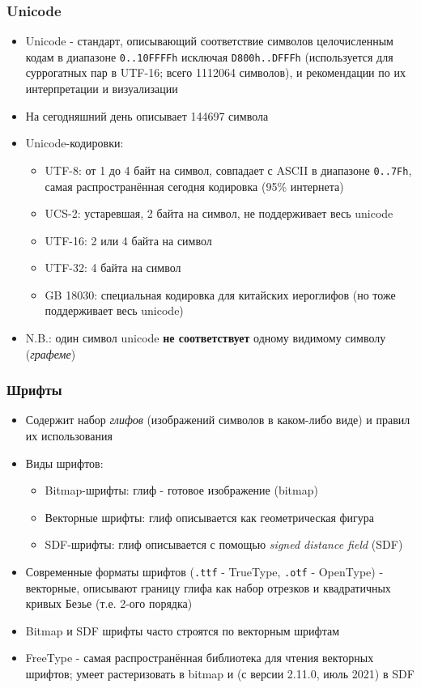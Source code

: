 \documentclass{beamer}
\begin{document}
\begin{frame}[fragile]
\frametitle{Unicode}
\begin{itemize}
\item Unicode - стандарт, описывающий соответствие символов целочисленным кодам в диапазоне \verb|0..10FFFFh| исключая \verb|D800h..DFFFh| (используется для суррогатных пар в UTF-16; всего 1112064 символов), и рекомендации по их интерпретации и визуализации
\pause
\item На сегодняшний день описывает 144697 символа
\pause
\item Unicode-кодировки:
\pause
\begin{itemize}
\item UTF-8: от 1 до 4 байт на символ, совпадает с ASCII в диапазоне \verb|0..7Fh|, самая распространённая сегодня кодировка (95\% интернета)
\pause
\item UCS-2: устаревшая, 2 байта на символ, не поддерживает весь unicode
\pause
\item UTF-16: 2 или 4 байта на символ
\pause
\item UTF-32: 4 байта на символ
\pause
\item GB 18030: специальная кодировка для китайских иероглифов (но тоже поддерживает весь unicode)
\end{itemize}
\pause
\item N.B.: один символ unicode \textbf{не соответствует} одному видимому символу (\textit{графеме})
\end{itemize}
\end{frame}

\begin{frame}[fragile]
\frametitle{Шрифты}
\begin{itemize}
\item Содержит набор \textit{глифов} (изображений символов в каком-либо виде) и правил их использования
\pause
\item Виды шрифтов:
\pause
\begin{itemize}
\item Bitmap-шрифты: глиф - готовое изображение (bitmap)
\pause
\item Векторные шрифты: глиф описывается как геометрическая фигура
\pause
\item SDF-шрифты: глиф описывается с помощью \textit{signed distance field} (SDF)
\end{itemize}
\pause
\item Современные форматы шрифтов (\verb|.ttf| - TrueType, \verb|.otf| - OpenType) - векторные, описывают границу глифа как набор отрезков и квадратичных кривых Безье (т.е. 2-ого порядка)
\pause
\item Bitmap и SDF шрифты часто строятся по векторным шрифтам
\pause
\item FreeType - самая распространённая библиотека для чтения векторных шрифтов; умеет растеризовать в bitmap и (с версии 2.11.0, июль 2021) в SDF
\end{itemize}
\end{frame}
\end{document}
